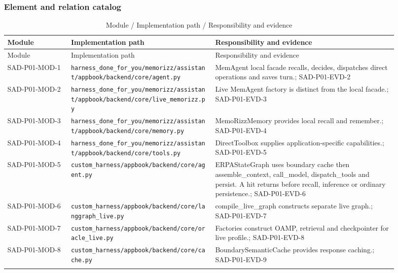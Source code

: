 \documentclass[10pt,letterpaper]{article}
\begin{document}
\subsubsection{Element and relation catalog}
\begin{longtable}{@{}>{\raggedright\arraybackslash}p{0.15\linewidth}>{\raggedright\arraybackslash}p{0.34\linewidth}>{\raggedright\arraybackslash}p{0.43\linewidth}@{}}
\caption{Module / Implementation path / Responsibility and evidence}\\
\toprule Module & Implementation path & Responsibility and evidence\\\midrule\endfirsthead
\toprule Module & Implementation path & Responsibility and evidence\\\midrule\endhead
SAD-P01-MOD-1 & \nolinkurl{harness_done_for_you/memorizz/assistant/appbook/backend/core/agent.py} & MemAgent local facade recalls, decides, dispatches direct operations and saves turn.; SAD-P01-EVD-2\\\addlinespace
SAD-P01-MOD-2 & \nolinkurl{harness_done_for_you/memorizz/assistant/appbook/backend/core/live_memorizz.py} & Live MemAgent factory is distinct from the local facade.; SAD-P01-EVD-3\\\addlinespace
SAD-P01-MOD-3 & \nolinkurl{harness_done_for_you/memorizz/assistant/appbook/backend/core/memory.py} & MemoRizzMemory provides local recall and remember.; SAD-P01-EVD-4\\\addlinespace
SAD-P01-MOD-4 & \nolinkurl{harness_done_for_you/memorizz/assistant/appbook/backend/core/tools.py} & DirectToolbox supplies application-specific capabilities.; SAD-P01-EVD-5\\\addlinespace
SAD-P01-MOD-5 & \nolinkurl{custom_harness/appbook/backend/core/agent.py} & ERPAStateGraph uses boundary cache then assemble\_context, call\_model, dispatch\_tools and persist. A hit returns before recall, inference or ordinary persistence.; SAD-P01-EVD-6\\\addlinespace
SAD-P01-MOD-6 & \nolinkurl{custom_harness/appbook/backend/core/langgraph_live.py} & compile\_live\_graph constructs separate live graph.; SAD-P01-EVD-7\\\addlinespace
SAD-P01-MOD-7 & \nolinkurl{custom_harness/appbook/backend/core/oracle_live.py} & Factories construct OAMP, retrieval and checkpointer for live profile.; SAD-P01-EVD-8\\\addlinespace
SAD-P01-MOD-8 & \nolinkurl{custom_harness/appbook/backend/core/cache.py} & BoundarySemanticCache provides response caching.; SAD-P01-EVD-9\\\addlinespace

\end{longtable}
\end{document}
